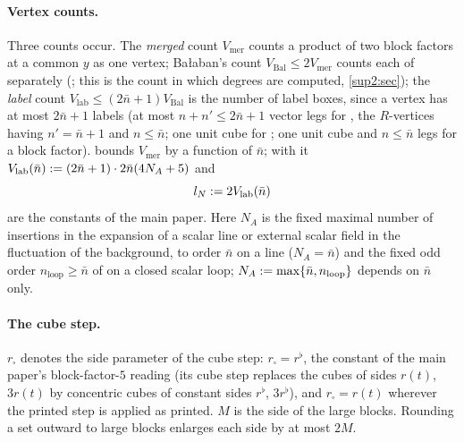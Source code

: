 \paragraph{Vertex counts.} Three counts occur. The \emph{merged} count $V_{\mathrm{mer}}$ counts a product \cite[(1.18)]{Ba3} of two block factors at a common $y$ as one vertex; Ba{\l}aban's count $V_{\mathrm{Bal}}\le2V_{\mathrm{mer}}$ counts each of \cite[(1.13)--(1.15)]{Ba3} separately (\cite[p.~414]{Ba3}; this is the count in which degrees are computed, \cref{sup2:sec}); the \emph{label} count $V_{\mathrm{lab}}\le(2\bar n+1)V_{\mathrm{Bal}}$ is the number of label boxes, since a vertex has at most $2\bar n+1$ labels (at most $n+n'\le2\bar n+1$ vector legs for \cite[(1.8)--(1.11)]{Ba3}, the $R$-vertices having $n'=\bar n+1$ and $n\le\bar n$; one unit cube for \cite[(1.6)--(1.7)]{Ba3}; one unit cube and $n\le\bar n$ legs for a block factor).  bounds $V_{\mathrm{mer}}$ by a function of $\bar n$; with it $V_{\mathrm{lab}}(\bar n):=(2\bar n+1)\cdot2\bar n(4N_A+5)$ and
\[
l_N:=2V_{\mathrm{lab}}(\bar n)
\]
are the constants of the main paper. Here $N_A$ is the fixed maximal number of insertions in the expansion of a scalar line or external scalar field in the fluctuation of the background, \cite[(3.45)]{Ba1} to order $\bar n$ on a line ($N_A=\bar n$) and the fixed odd order $n_{\mathrm{loop}}\ge\bar n$ of \cite[(3.47)]{Ba1} on a closed scalar loop; $N_A:=\max\{\bar n,n_{\mathrm{loop}}\}$ depends on $\bar n$ only.

\paragraph{The cube step.} $r_\square$ denotes the side parameter of the cube step: $r_\square=r^\flat$, the constant of the main paper's block-factor-$5$ reading (its cube step replaces the cubes of sides $r(t)$, $3r(t)$ by concentric cubes of constant sides $r^\flat$, $3r^\flat$), and $r_\square=r(t)$ wherever the printed step is applied as printed. $M$ is the side of the large blocks. Rounding a set outward to large blocks enlarges each side by at most $2M$.
